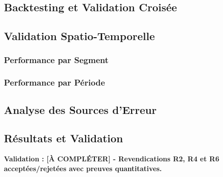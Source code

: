 \subsection{Backtesting et Validation Croisée}
\label{subsec:backtesting}

\subsection{Validation Spatio-Temporelle}
\label{subsec:validation_spatiotemporelle}

\subsubsection{Performance par Segment}

\subsubsection{Performance par Période}

\subsection{Analyse des Sources d'Erreur}
\label{subsec:analyse_erreurs}


\subsection{Résultats et Validation}
\label{subsec:resultats_jumeau}

\textbf{Validation : [À COMPLÉTER] - Revendications R2, R4 et R6 acceptées/rejetées avec preuves quantitatives.}

